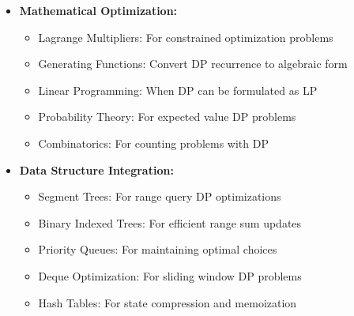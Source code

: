 \documentclass[a4paper,10pt]{book}
\begin{document}
\begin{itemize}[leftmargin=*]
    \item \textbf{Mathematical Optimization:}
    \begin{itemize}
        \item Lagrange Multipliers: For constrained optimization problems
        \item Generating Functions: Convert DP recurrence to algebraic form
        \item Linear Programming: When DP can be formulated as LP
        \item Probability Theory: For expected value DP problems
        \item Combinatorics: For counting problems with DP
    \end{itemize}

    \item \textbf{Data Structure Integration:}
    \begin{itemize}
        \item Segment Trees: For range query DP optimizations
        \item Binary Indexed Trees: For efficient range sum updates
        \item Priority Queues: For maintaining optimal choices
        \item Deque Optimization: For sliding window DP problems
        \item Hash Tables: For state compression and memoization
    \end{itemize}
\end{itemize}
\end{document}
